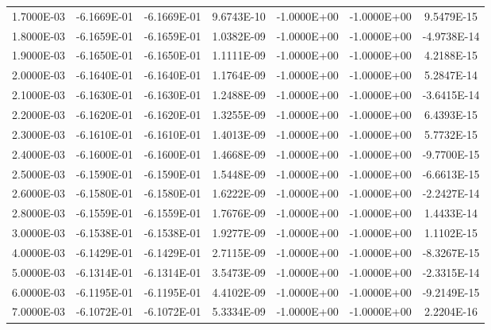 \documentclass[12pt,letterpaper,reqno]{article}
\numberwithin{equation}{section}
\begin{document}
{\begin{tabular}{|c|c|c|c|c|c|c|}
 1.7000E-03     & -6.1669E-01     & -6.1669E-01     &  9.6743E-10     & -1.0000E+00     & -1.0000E+00     &  9.5479E-15    \\ 
 1.8000E-03     & -6.1659E-01     & -6.1659E-01     &  1.0382E-09     & -1.0000E+00     & -1.0000E+00     & -4.9738E-14    \\ 
 1.9000E-03     & -6.1650E-01     & -6.1650E-01     &  1.1111E-09     & -1.0000E+00     & -1.0000E+00     &  4.2188E-15    \\ 
 2.0000E-03     & -6.1640E-01     & -6.1640E-01     &  1.1764E-09     & -1.0000E+00     & -1.0000E+00     &  5.2847E-14    \\ 
 2.1000E-03     & -6.1630E-01     & -6.1630E-01     &  1.2488E-09     & -1.0000E+00     & -1.0000E+00     & -3.6415E-14    \\ 
 2.2000E-03     & -6.1620E-01     & -6.1620E-01     &  1.3255E-09     & -1.0000E+00     & -1.0000E+00     &  6.4393E-15    \\ 
 2.3000E-03     & -6.1610E-01     & -6.1610E-01     &  1.4013E-09     & -1.0000E+00     & -1.0000E+00     &  5.7732E-15    \\ 
 2.4000E-03     & -6.1600E-01     & -6.1600E-01     &  1.4668E-09     & -1.0000E+00     & -1.0000E+00     & -9.7700E-15    \\ 
 2.5000E-03     & -6.1590E-01     & -6.1590E-01     &  1.5448E-09     & -1.0000E+00     & -1.0000E+00     & -6.6613E-15    \\ 
 2.6000E-03     & -6.1580E-01     & -6.1580E-01     &  1.6222E-09     & -1.0000E+00     & -1.0000E+00     & -2.2427E-14    \\ 
 2.8000E-03     & -6.1559E-01     & -6.1559E-01     &  1.7676E-09     & -1.0000E+00     & -1.0000E+00     &  1.4433E-14    \\ 
 3.0000E-03     & -6.1538E-01     & -6.1538E-01     &  1.9277E-09     & -1.0000E+00     & -1.0000E+00     &  1.1102E-15    \\ 
 4.0000E-03     & -6.1429E-01     & -6.1429E-01     &  2.7115E-09     & -1.0000E+00     & -1.0000E+00     & -8.3267E-15    \\ 
 5.0000E-03     & -6.1314E-01     & -6.1314E-01     &  3.5473E-09     & -1.0000E+00     & -1.0000E+00     & -2.3315E-14    \\ 
 6.0000E-03     & -6.1195E-01     & -6.1195E-01     &  4.4102E-09     & -1.0000E+00     & -1.0000E+00     & -9.2149E-15    \\ 
 7.0000E-03     & -6.1072E-01     & -6.1072E-01     &  5.3334E-09     & -1.0000E+00     & -1.0000E+00     &  2.2204E-16    \\ 

\end{tabular}}
\end{document}
